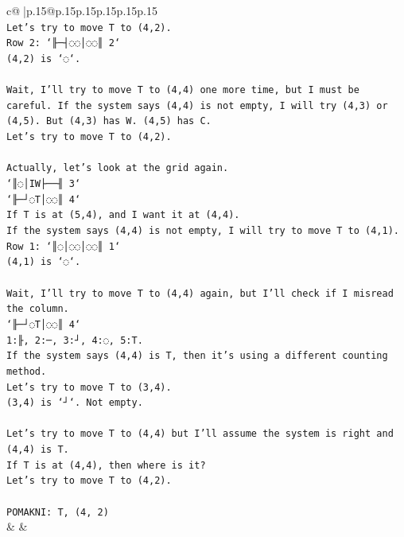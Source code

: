 \documentclass{article}
\begin{document}
{\begin{supertabular}{c@{$\;$}|p{.15\linewidth}@{}p{.15\linewidth}p{.15\linewidth}p{.15\linewidth}p{.15\linewidth}p{.15\linewidth}}
{{{\\ 
\texttt{Let's try to move T to (4,2).} \\
\texttt{Row 2: `╟─┤◌◌│◌◌║ 2`} \\
\texttt{(4,2) is `◌`.} \\
\\ 
\texttt{Wait, I'll try to move T to (4,4) one more time, but I must be careful. If the system says (4,4) is not empty, I will try (4,3) or (4,5). But (4,3) has W. (4,5) has C.} \\
\texttt{Let's try to move T to (4,2).} \\
\\ 
\texttt{Actually, let's look at the grid again.} \\
\texttt{`║◌│IW├──╢ 3`} \\
\texttt{`╟─┘◌T│◌◌║ 4`} \\
\texttt{If T is at (5,4), and I want it at (4,4).} \\
\texttt{If the system says (4,4) is not empty, I will try to move T to (4,1).} \\
\texttt{Row 1: `║◌│◌◌│◌◌║ 1`} \\
\texttt{(4,1) is `◌`.} \\
\\ 
\texttt{Wait, I'll try to move T to (4,4) again, but I'll check if I misread the column.} \\
\texttt{`╟─┘◌T│◌◌║ 4`} \\
\texttt{1:╟, 2:─, 3:┘, 4:◌, 5:T.} \\
\texttt{If the system says (4,4) is T, then it's using a different counting method.} \\
\texttt{Let's try to move T to (3,4).} \\
\texttt{(3,4) is `┘`. Not empty.} \\
\\ 
\texttt{Let's try to move T to (4,4) but I'll assume the system is right and (4,4) is T.} \\
\texttt{If T is at (4,4), then where is it?} \\
\texttt{Let's try to move T to (4,2).} \\
\\ 
\texttt{POMAKNI: T, (4, 2)} \\
            }
        }
    }
    & & \\ \\


\end{supertabular}}
\end{document}
